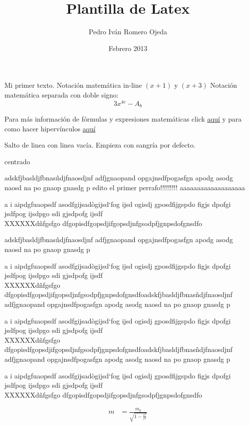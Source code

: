 \documentclass[12pt]{article}
\title{Plantilla de Latex}
\author{Pedro Iván Romero Ojeda}
\date{Febrero 2013}
\begin{document}
\maketitle
Mi primer texto. Notación matemática in-line $(x+1)$ y $(x+3)$ Notación matemática separada con doble signo: $$3x^{4e} - A_b$$

Para más información de fórmulas y expresiones matemáticas click \href{http://en.wikibooks.org/wiki/LaTeX/Mathematics}{aquí} y para como hacer hipervínculos \href{http://en.wikibooks.org/wiki/LaTeX/Hyperlinks}{aquí}

Salto de linea con linea vacía. Empieza con sangría por defecto.
\begin{center}
centrado %
\end{center}


adskfjbasldjfbnasñdjfnaosdjnf adfjgnaopand opgajnsdfpogasfgn apodg asodg naosd na po gnaop gnasdg p edito el primer perrafo!!!!!!!!! aaaaaaaaaaaaaaaaaaa

a i aipdgfuaopsdf asodfgijsadògijsd`fog ijsd ogisdj gposdfijgspdo figjs dpofgi jsdfpog ijsdpgo sdi gjsdpofg ijsdf\\
XXXXXXdñfgsfgo dfgopisdfgopsdjifgopsdjnfgsodpfjgnpsdofgnsdfo

adskfjbasldjfbnasñdjfnaosdjnf adfjgnaopand opgajnsdfpogasfgn apodg asodg naosd na po gnaop gnasdg p

a i aipdgfuaopsdf asodfgijsadògijsd`fog ijsd ogisdj gposdfijgspdo figjs dpofgi jsdfpog ijsdpgo sdi gjsdpofg ijsdf\\
XXXXXXdñfgsfgo dfgopisdfgopsdjifgopsdjnfgsodpfjgnpsdofgnsdfoadskfjbasldjfbnasñdjfnaosdjnf adfjgnaopand opgajnsdfpogasfgn apodg asodg naosd na po gnaop gnasdg p

a i aipdgfuaopsdf asodfgijsadògijsd`fog ijsd ogisdj gposdfijgspdo figjs dpofgi jsdfpog ijsdpgo sdi gjsdpofg ijsdf\\
XXXXXXdñfgsfgo dfgopisdfgopsdjifgopsdjnfgsodpfjgnpsdofgnsdfoadskfjbasldjfbnasñdjfnaosdjnf adfjgnaopand opgajnsdfpogasfgn apodg asodg naosd na po gnaop gnasdg p

a i aipdgfuaopsdf asodfgijsadògijsd`fog ijsd ogisdj gposdfijgspdo figjs dpofgi jsdfpog ijsdpgo sdi gjsdpofg ijsdf\\
XXXXXXdñfgsfgo dfgopisdfgopsdjifgopsdjnfgsodpfjgnpsdofgnsdfo

\begin{align}
m &= \frac{m_0}{\sqrt{1-\frac{v^2}{c^2}}}
\end{align}
\end{document}
